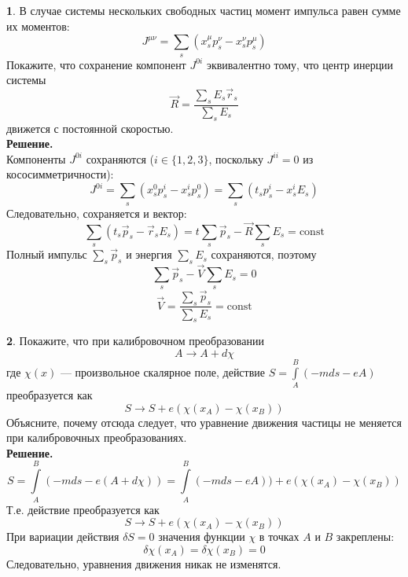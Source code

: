 \documentclass[12pt]{article}
\theoremstyle{definition}
\newtheorem{zad}{}[section]
\begin{document}
\begin{zad}
В случае системы нескольких свободных частиц момент импульса равен сумме их моментов:
\begin{equation}
    J^{\mu\nu}=\sum_s(x_s^\mu p_s^\nu-x_s^\nu p_s^\mu)
\end{equation}
Покажите, что сохранение компонент $J^{0i}$ эквивалентно тому, что центр инерции системы
\begin{equation}
    \vec{R}=\frac{\sum\limits_sE_s\vec{r}_s}{\sum\limits_sE_s}
\end{equation}
движется с постоянной скоростью.\\
\textbf{Решение.}\\
Компоненты $J^{0i}$ сохраняются ($i\in\{1,2,3\}$, поскольку $J^{ii}=0$ из кососимметричности):
\begin{equation}
    J^{0i}=\sum_s(x_s^0 p_s^i-x_s^i p_s^0)=\sum_s(t_s p_s^i-x_s^i E_s)
\end{equation}
Следовательно, сохраняется и вектор:
\begin{equation}
    \sum_s(t_s \vec{p}_s-\vec{r}_s E_s)=t\sum_s \vec{p}_s-\vec{R}\sum_s E_s=\text{const}
\end{equation}
Полный импульс $\sum\limits_s \vec{p}_s$ и энергия $\sum\limits_s E_s$ сохраняются, поэтому
\begin{equation}
    \sum_s \vec{p}_s-\vec{V}\sum_sE_s=0
\end{equation}
\begin{equation}
    \boxed{\vec{V}=\frac{\sum\limits_s \vec{p}_s}{\sum\limits_s E_s}=\text{const}}
\end{equation}
\end{zad}
\begin{zad}
Покажите, что при калибровочном преобразовании
\begin{equation}
    A\rightarrow A+d\chi
\end{equation}
где $\chi(x)$ — произвольное скалярное поле, действие $S=\int\limits_A^B(-mds-eA)$ преобразуется как
\begin{equation}
    S\rightarrow S+e(\chi(x_A)-\chi(x_B))
\end{equation}
Объясните, почему отсюда следует, что уравнение движения частицы не меняется при калибровочных преобразованиях.\\
\textbf{Решение.}\\
\begin{equation}
    S=\int\limits_A^B(-mds-e(A+d\chi))=\int\limits_A^B(-mds-eA))+e(\chi(x_A)-\chi(x_B))
\end{equation}
Т.е. действие преобразуется как
\begin{equation}
    \boxed{S\rightarrow S+e(\chi(x_A)-\chi(x_B))}
\end{equation}
При вариации действия $\delta S=0$ значения функции $\chi$ в точках $A$ и $B$ закреплены:
\begin{equation}
    \delta\chi(x_A)=\delta\chi(x_B)=0
\end{equation}
Следовательно, уравнения движения никак не изменятся.
\end{zad}
\end{document}
